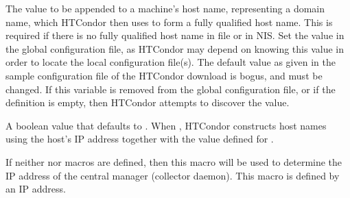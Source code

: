 \begin{description}
\label{param:DefaultDomainName}
\item[\Macro{DEFAULT\_DOMAIN\_NAME}]
  The value to be appended to a machine's host name,
  representing a domain name, which HTCondor then uses
  to form a fully qualified host name.
  This is required if there is no fully qualified host name 
  in file  or in NIS.
  Set the value in the global configuration file,
  as HTCondor may depend on knowing this value in order to locate
  the local configuration file(s).
  The default value as given in the sample configuration file of
  the HTCondor download is bogus, and must be changed.
  If this variable is removed from the global configuration file,
  or if the definition is empty, then HTCondor attempts to discover
  the value.

\label{param:NoDNS}
\item[\Macro{NO\_DNS}]
  A boolean value that defaults to .
  When , HTCondor constructs host names using the host's IP address
  together with the value defined for . 

\label{param:CMIPAddr}
\item[\Macro{CM\_IP\_ADDR}]
  If neither  nor 
   macros are defined, then this
  macro will be used to determine the IP address of the central
  manager (collector daemon).
  This macro is defined by an IP address.


\end{description}
